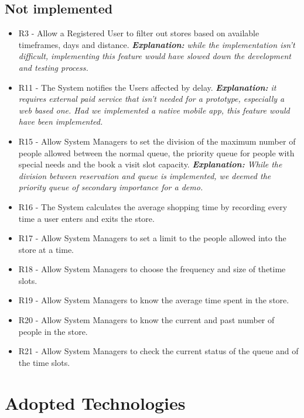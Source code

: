 \documentclass[
]{article}
\begin{document}
\hypertarget{not-implemented}{%
\subsection{Not implemented}\label{not-implemented}}

\begin{itemize}
\item
  R3 - Allow a Registered User to filter out stores based on
  available timeframes, days and distance. \emph{\textbf{Explanation:}
  while the implementation isn't difficult, implementing this feature
  would have slowed down the development and testing process.}
\item
  R11 - The System notifies the Users affected by delay.
  \emph{\textbf{Explanation:} it requires external paid service that
  isn't needed for a prototype, especially a web based one. Had we
  implemented a native mobile app, this feature would have been
  implemented.}
\item
  R15 - Allow System Managers to set the division of the maximum number
  of people allowed between the normal queue, the priority queue for
  people with special needs and the book a visit slot capacity. \emph{\textbf{Explanation:} While the division between reservation and queue is implemented, we deemed the priority queue of secondary importance for a demo.}
\item
  R16 - The System calculates the average shopping time by recording
  every time a user enters and exits the store.
\item
  R17 - Allow System Managers to set a limit to the people allowed
  into the store at a time.
\item
  R18 - Allow System Managers to choose the frequency and size of
  thetime slots.
\item
  R19 - Allow System Managers to know the average time spent in
  the store.
\item
  R20 - Allow System Managers to know the current and past number
  of people in the store.
\item
  R21 - Allow System Managers to check the current status of the
  queue and of the time slots.

\end{itemize}

\hypertarget{adopted-technologies}{%
\section{Adopted Technologies}\label{adopted-technologies}}
\end{document}
